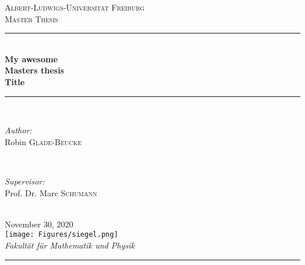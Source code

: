 \begin{titlepage}
\newcommand{\HRule}{\rule{\linewidth}{0.25mm}} %
\center
\textsc{\LARGE Albert-Ludwigs-Universit\"{a}t Freiburg}\\[1.5cm]
\textsc{\Large Master Thesis}\\[0.4cm]
\HRule \\[0.4cm]
\huge \textbf{My awesome}\\\textbf{Masters thesis}\\\textbf{Title}  %
\HRule \\[1.0cm]
\begin{minipage}{0.4\textwidth}
\begin{flushleft} \large
\emph{Author:}\\
Robin \textsc{Glade-Beucke} \\
\end{flushleft}
\end{minipage}
~
\begin{minipage}{0.4\textwidth}
\begin{flushright} \large
\emph{Supervisor:} \\
Prof. Dr. Marc \textsc{Schumann} \\
\end{flushright}
\end{minipage}\\[1cm]

{\large November 30, 2020}\\[0.8cm]

\texttt{[image: Figures/siegel.png]}\\[1cm]

\large \emph{Fakult\"{a}t f\"{u}r Mathematik und Physik}\\[0.4cm]

\HRule \\
\setcounter{page}{0}
\end{titlepage}
